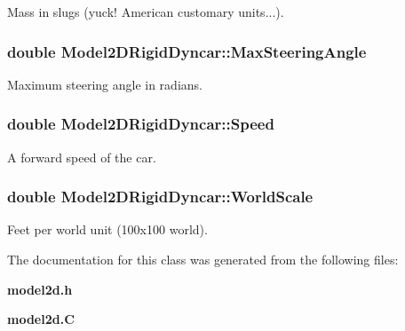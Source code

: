 Mass in slugs (yuck! American customary units...).

\subsubsection{\setlength{\rightskip}{0pt plus 5cm}double Model2DRigid\-Dyncar::Max\-Steering\-Angle}\label{classModel2DRigidDyncar_m7}


Maximum steering angle in radians.

\subsubsection{\setlength{\rightskip}{0pt plus 5cm}double Model2DRigid\-Dyncar::Speed}\label{classModel2DRigidDyncar_m8}


A forward speed of the car.

\subsubsection{\setlength{\rightskip}{0pt plus 5cm}double Model2DRigid\-Dyncar::World\-Scale}\label{classModel2DRigidDyncar_m6}


Feet per world unit (100x100 world).



The documentation for this class was generated from the following files:\begin{CompactItemize}
\item 
{\bf model2d.h}\item 
{\bf model2d.C}\end{CompactItemize}
